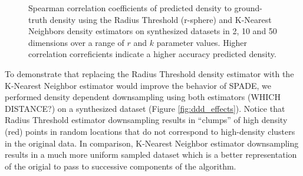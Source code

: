 \documentclass{article}
\begin{document}
\begin{figure}
\begin{center}

\caption{Spearman correlation coefficients of predicted density to ground-truth density using the Radius Threshold (r-sphere) and K-Nearest Neighbors density estimators on synthesized datasets in 2, 10 and 50 dimensions over a range of $r$ and $k$ parameter values. 
Higher correlation correficients indicate a higher accuracy predicted density. }
\label{fig:ddd_results}
\end{center}
\end{figure}

To demonstrate that replacing the Radius Threshold density estimator with the K-Nearest Neighbor estimator would improve the behavior of SPADE, we performed density dependent downsampling using both estimators (WHICH DISTANCE?) on a synthesized dataset (Figure \ref{fig:ddd_effects}).
  Notice that  Radius Threshold estimator downsampling results in ``clumps'' of high density (red) points in random locations that do not correspond to high-density clusters in the original data.
  In comparison, K-Nearest Neighbor estimator downsampling results in a much more uniform sampled dataset which is a better representation of the origial to pass to successive components of the algorithm. 
\end{document}
